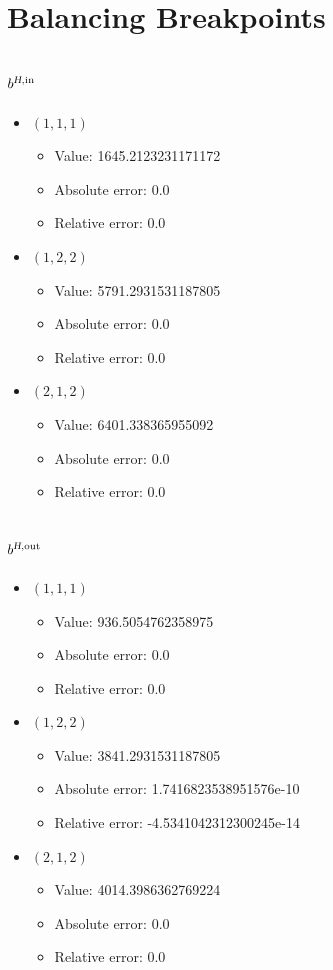 \documentclass{article}%
\begin{document}
\section{Balancing Breakpoints}%
\subsection{$b^{\textsl{H},\text{in}}$}%
\begin{itemize}%
	\item $(1, 1, 1)$%
	\begin{itemize}%
		\item Value: 1645.2123231171172%
		\item Absolute error: 0.0%
		\item Relative error: 0.0%
	\end{itemize}%
	\item $(1, 2, 2)$%
	\begin{itemize}%
		\item Value: 5791.2931531187805%
		\item Absolute error: 0.0%
		\item Relative error: 0.0%
	\end{itemize}%
	\item $(2, 1, 2)$%
	\begin{itemize}%
		\item Value: 6401.338365955092%
		\item Absolute error: 0.0%
		\item Relative error: 0.0%
	\end{itemize}%
\end{itemize}%
\subsection{$b^{\textsl{H},\text{out}}$}%
\begin{itemize}%
	\item $(1, 1, 1)$%
	\begin{itemize}%
		\item Value: 936.5054762358975%
		\item Absolute error: 0.0%
		\item Relative error: 0.0%
	\end{itemize}%
	\item $(1, 2, 2)$%
	\begin{itemize}%
		\item Value: 3841.2931531187805%
		\item Absolute error: 1.7416823538951576e-10%
		\item Relative error: -4.5341042312300245e-14%
	\end{itemize}%
	\item $(2, 1, 2)$%
	\begin{itemize}%
		\item Value: 4014.3986362769224%
		\item Absolute error: 0.0%
		\item Relative error: 0.0%
	\end{itemize}%
\end{itemize}%
\end{document}
